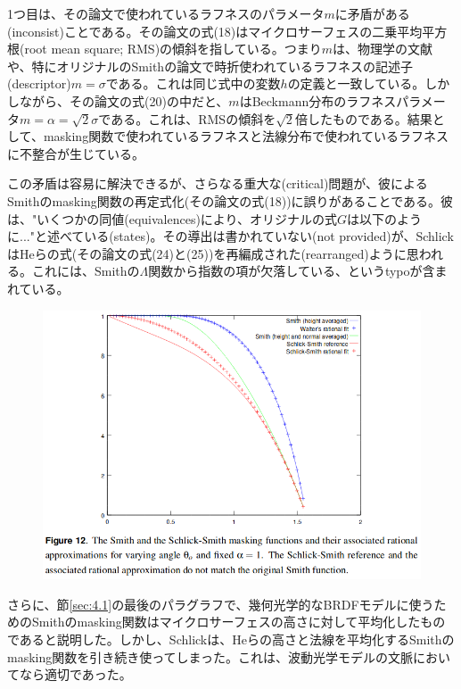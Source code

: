 \documentclass[a4j,xelatex,ja=standard]{bxjsarticle}
\begin{document}
1つ目は、その論文で使われているラフネスのパラメータ$m$に矛盾がある(inconsist)ことである。その論文の式(18)はマイクロサーフェスの二乗平均平方根(root mean square; RMS)の傾斜を指している。つまり$m$は、物理学の文献や、特にオリジナルのSmithの論文で時折使われているラフネスの記述子(descriptor)$m = \sigma$である。これは同じ式中の変数$h$の定義と一致している。しかしながら、その論文の式(20)の中だと、$m$はBeckmann分布のラフネスパラメータ$m = \alpha = \sqrt{2} \sigma$である。これは、RMSの傾斜を$\sqrt{2}$倍したものである。結果として、masking関数で使われているラフネスと法線分布で使われているラフネスに不整合が生じている。

この矛盾は容易に解決できるが、さらなる重大な(critical)問題が、彼によるSmithのmasking関数の再定式化(その論文の式(18))に誤りがあることである。彼は、"いくつかの同値(equivalences)により、オリジナルの式$G$は以下のように..."と述べている(states)。その導出は書かれていない(not provided)が、SchlickはHeらの式(その論文の式(24)と(25))を再編成された(rearranged)ように思われる。これには、Smithの$\Lambda$関数から指数の項が欠落している、というtypoが含まれている。

\begin{figure}
    \includegraphics[width=\textwidth]{Figure12.png}
    \caption{}
    \label{fig:12}
\end{figure}

さらに、節\ref{sec:4.1}の最後のパラグラフで、幾何光学的なBRDFモデルに使うためのSmithのmasking関数はマイクロサーフェスの高さに対して平均化したものであると説明した。しかし、Schlickは、Heらの高さと法線を平均化するSmithのmasking関数を引き続き使ってしまった。これは、波動光学モデルの文脈においてなら適切であった。
\end{document}
